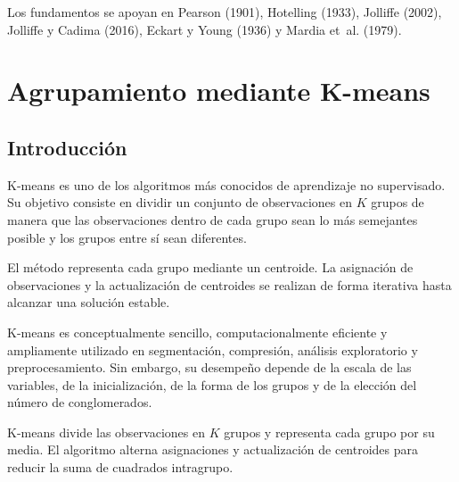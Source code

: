 \documentclass[
  spanish,
  10.5pt,
  letterpaper,
  DIV=11,
  numbers=noendperiod,
  oneside,
  open=any]{scrreprt}
\theoremstyle{definition}
\theoremstyle{definition}
\theoremstyle{plain}
\theoremstyle{remark}
\begin{document}

Los fundamentos se apoyan en Pearson (1901), Hotelling (1933), Jolliffe
(2002), Jolliffe y Cadima (2016), Eckart y Young (1936) y Mardia et~al.
(1979).

\chapter{\texorpdfstring{Agrupamiento mediante
K-means}{Agrupamiento mediante K-means}}\label{sec-kmeans}

\section*{Introducción}\label{introducciuxf3n-18}


K-means es uno de los algoritmos más conocidos de aprendizaje no
supervisado. Su objetivo consiste en dividir un conjunto de
observaciones en \(K\) grupos de manera que las observaciones dentro de
cada grupo sean lo más semejantes posible y los grupos entre sí sean
diferentes.

El método representa cada grupo mediante un centroide.
La asignación de observaciones y la actualización de centroides se
realizan de forma iterativa hasta alcanzar una solución estable.

K-means es conceptualmente sencillo, computacionalmente eficiente y
ampliamente utilizado en segmentación, compresión, análisis exploratorio
y preprocesamiento. Sin embargo, su desempeño depende de la escala de
las variables, de la inicialización, de la forma de los grupos y de la
elección del número de conglomerados.

\begin{tcolorbox}[enhanced jigsaw, arc=.35mm, bottomrule=.15mm, bottomtitle=1mm, breakable, colback=white, colbacktitle=quarto-callout-important-color!10!white, colframe=quarto-callout-important-color-frame, coltitle=black, left=2mm, leftrule=.75mm, opacityback=0, opacitybacktitle=0.6, rightrule=.15mm, title=\textcolor{quarto-callout-important-color}{\faExclamation}\hspace{0.5em}{Definición esencial}, titlerule=0mm, toprule=.15mm, toptitle=1mm]

K-means divide las observaciones en \(K\) grupos y representa cada grupo
por su media. El algoritmo alterna asignaciones y actualización de
centroides para reducir la suma de cuadrados intragrupo.

\end{tcolorbox}
\end{document}

